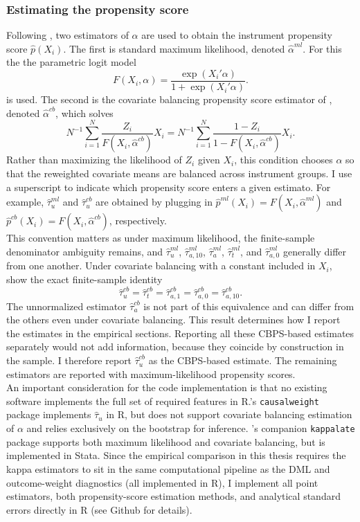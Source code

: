 \documentclass[12pt, a4paper, oneside]{article}
\theoremstyle{plain}
\theoremstyle{definition}
\begin{document}
\subsubsection*{Estimating the propensity score}
Following \citet{sloczynski2025abadie}, two estimators of $\alpha$ are used to
obtain the instrument propensity score $\hat p(X_i)$.
The first is standard maximum likelihood,
denoted $\hat\alpha^{ml}$. For this the the parametric logit model
\[
F(X_i,\alpha)=\frac{\exp(X_i'\alpha)}{1+\exp(X_i'\alpha)}.
\] is used.
The second is the covariate balancing propensity
score estimator of \citet{imai2014covariate}, denoted $\hat\alpha^{cb}$, which
solves
\begin{equation}
    N^{-1}\sum_{i=1}^N \frac{Z_i}{F(X_i,\hat\alpha^{cb})}X_i =
    N^{-1}\sum_{i=1}^N \frac{1-Z_i}{1-F(X_i,\hat\alpha^{cb})}X_i.
    \label{eq:cbps_moment}
\end{equation}
Rather than maximizing the likelihood of $Z_i$ given $X_i$, this condition
chooses $\alpha$ so that the reweighted covariate means are balanced across
instrument groups.  
I use a superscript to indicate which propensity score enters a given
estimato. For example,
$\hat\tau_u^{ml}$ and $\hat\tau_u^{cb}$ are obtained by plugging in
$\hat p^{ml}(X_i)=F(X_i,\hat\alpha^{ml})$ and
$\hat p^{cb}(X_i)=F(X_i,\hat\alpha^{cb})$, respectively. \\
This convention matters as under maximum likelihood, the
finite-sample denominator ambiguity remains, and
$\hat\tau_u^{ml}$, $\hat\tau_{a,10}^{ml}$, $\hat\tau_a^{ml}$, $\hat\tau_t^{ml}$,
and $\hat\tau_{a,0}^{ml}$ generally differ from one another. Under covariate balancing with a constant included
in $X_i$, \citet{sloczynski2025abadie} show the exact finite-sample identity
\[
\hat\tau_u^{cb}
=
\hat\tau_t^{cb}
=
\hat\tau_{a,1}^{cb}
=
\hat\tau_{a,0}^{cb}
=
\hat\tau_{a,10}^{cb}.
\]
The unnormalized estimator $\hat\tau_a^{cb}$ is not part of this equivalence and can differ from
the others even under covariate balancing.
This result determines how I report the estimates in the empirical sections.
Reporting all these CBPS-based estimates separately would not add
information, because they coincide by construction in the sample. I therefore report
$\hat\tau_u^{cb}$ as the CBPS-based estimate.
The remaining estimators are
reported with maximum-likelihood propensity scores. \\
An important consideration for the code implementation is that no existing
software implements the full set of required features in R.\citet{bodory2018causalweight}'s \texttt{causalweight} package
implements $\hat\tau_u$ in R, but does not support covariate balancing
estimation of $\alpha$ and relies exclusively on the bootstrap for inference.
\citet{sloczynski2025abadie}'s companion \texttt{kappalate} package supports
both maximum likelihood and covariate balancing, but is implemented in Stata. Since the empirical
comparison in this thesis requires the kappa estimators to sit in the same
computational pipeline as the DML and outcome-weight diagnostics (all implemented in R), I implement all point estimators,
both propensity-score estimation methods, and analytical standard errors
directly in R (see Github for details).
\end{document}
